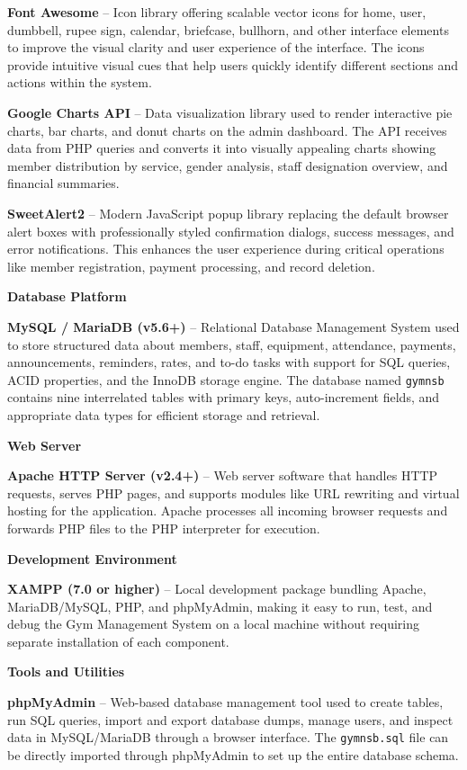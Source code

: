\documentclass[12pt,a4paper]{report}
\begin{document}
\textbf{Font Awesome} -- Icon library offering scalable vector icons for home, user, dumbbell, rupee sign, calendar, briefcase, bullhorn, and other interface elements to improve the visual clarity and user experience of the interface. The icons provide intuitive visual cues that help users quickly identify different sections and actions within the system.

\textbf{Google Charts API} -- Data visualization library used to render interactive pie charts, bar charts, and donut charts on the admin dashboard. The API receives data from PHP queries and converts it into visually appealing charts showing member distribution by service, gender analysis, staff designation overview, and financial summaries.

\textbf{SweetAlert2} -- Modern JavaScript popup library replacing the default browser alert boxes with professionally styled confirmation dialogs, success messages, and error notifications. This enhances the user experience during critical operations like member registration, payment processing, and record deletion.

\textbf{Database Platform}

\textbf{MySQL / MariaDB (v5.6+)} -- Relational Database Management System used to store structured data about members, staff, equipment, attendance, payments, announcements, reminders, rates, and to-do tasks with support for SQL queries, ACID properties, and the InnoDB storage engine. The database named \texttt{gymnsb} contains nine interrelated tables with primary keys, auto-increment fields, and appropriate data types for efficient storage and retrieval.

\textbf{Web Server}

\textbf{Apache HTTP Server (v2.4+)} -- Web server software that handles HTTP requests, serves PHP pages, and supports modules like URL rewriting and virtual hosting for the application. Apache processes all incoming browser requests and forwards PHP files to the PHP interpreter for execution.

\textbf{Development Environment}

\textbf{XAMPP (7.0 or higher)} -- Local development package bundling Apache, MariaDB/MySQL, PHP, and phpMyAdmin, making it easy to run, test, and debug the Gym Management System on a local machine without requiring separate installation of each component.

\textbf{Tools and Utilities}

\textbf{phpMyAdmin} -- Web-based database management tool used to create tables, run SQL queries, import and export database dumps, manage users, and inspect data in MySQL/MariaDB through a browser interface. The \texttt{gymnsb.sql} file can be directly imported through phpMyAdmin to set up the entire database schema.
\end{document}
